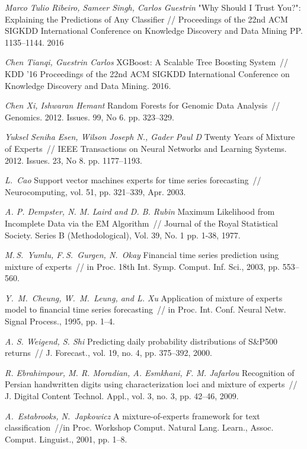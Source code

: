 \documentclass[12pt, twoside]{article}
\numberwithin{equation}{section}
\begin{document}
\begin{thebibliography}{99}
	\textit{Marco Tulio Ribeiro, Sameer Singh, Carlos Guestrin} "Why Should I Trust You?": Explaining the Predictions of Any Classifier // Proceedings of the 22nd ACM SIGKDD International Conference on Knowledge Discovery and Data Mining PP. 1135--1144. 2016

	\textit{Chen Tianqi, Guestrin Carlos} XGBoost: A Scalable Tree Boosting System~// KDD ’16 Proceedings of the 22nd ACM SIGKDD International Conference on Knowledge Discovery and Data Mining. 2016.
	
	\textit{Chen Xi, Ishwaran Hemant} Random Forests for Genomic Data Analysis~// Genomics. 2012. Issues. 99, No 6. pp. 323--329.

	\textit{Yuksel Seniha Esen, Wilson Joseph N., Gader Paul D} Twenty Years of Mixture of Experts~// IEEE Transactions on Neural Networks and Learning Systems. 2012. Issues. 23, No 8. pp. 1177--1193.


	\textit{L.~Cao} Support vector machines experts for time series forecasting~// Neurocomputing, vol. 51, pp. 321–339, Apr. 2003.

	\textit{A. P. Dempster, N. M. Laird and D. B. Rubin} Maximum Likelihood from Incomplete Data via the EM Algorithm~// Journal of the Royal Statistical Society. Series B (Methodological), Vol. 39, No. 1 pp. 1-38, 1977.
	
	
	\textit{M.\,S.~Yumlu, F.\,S.~Gurgen,  N.~Okay} Financial time series prediction using mixture of experts~// in Proc. 18th Int. Symp. Comput. Inf. Sci., 2003, pp. 553--560.
	
	\textit{Y.~M.~Cheung, W.~M.~Leung, and L. Xu} Application of mixture of experts model to financial time series forecasting~// in Proc. Int. Conf. Neural Netw. Signal Process., 1995, pp. 1--4.
	
	\textit{A. S. Weigend, S. Shi} Predicting daily probability distributions of S\&P500 returns~// J. Forecast., vol. 19, no. 4, pp. 375--392, 2000.
	
	\textit{R. Ebrahimpour, M. R. Moradian, A. Esmkhani, F. M. Jafarlou} Recognition of Persian handwritten digits using characterization loci and mixture of experts~// J. Digital Content Technol. Appl., vol. 3, no. 3, pp. 42–46, 2009.
	
	\textit{A.~Estabrooks, N.~Japkowicz} A mixture-of-experts framework for text classification~//in Proc. Workshop Comput. Natural Lang. Learn., Assoc. Comput. Linguist., 2001, pp. 1--8.
	

\end{thebibliography}
\end{document}
